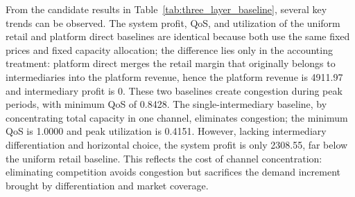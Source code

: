 \documentclass[11pt,a4paper]{article}
\begin{document}
\begin{table}[H]
\centering
\caption{Three-party market baseline results. Profit figures are synthetic model indicators; QoS is the effective completion fraction. ``vs Uniform Retail'' indicates the weak-baseline reference with fixed prices and fixed capacities; ``vs No-QoS Dynamic'' indicates the primary QoS incremental reference.}
\label{tab:three_layer_baseline}
\small
{}
\end{table}

From the candidate results in Table~\ref{tab:three_layer_baseline}, several key trends can be observed. The system profit, QoS, and utilization of the uniform retail and platform direct baselines are identical because both use the same fixed prices and fixed capacity allocation; the difference lies only in the accounting treatment: platform direct merges the retail margin that originally belongs to intermediaries into the platform revenue, hence the platform revenue is 4911.97 and intermediary profit is 0. These two baselines create congestion during peak periods, with minimum QoS of 0.8428. The single-intermediary baseline, by concentrating total capacity in one channel, eliminates congestion; the minimum QoS is 1.0000 and peak utilization is 0.4151. However, lacking intermediary differentiation and horizontal choice, the system profit is only 2308.55, far below the uniform retail baseline. This reflects the cost of channel concentration: eliminating competition avoids congestion but sacrifices the demand increment brought by differentiation and market coverage.
\end{document}
